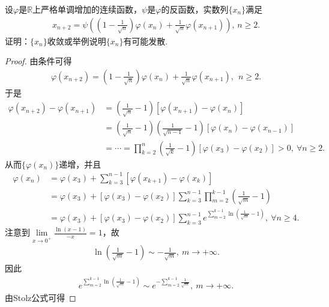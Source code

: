 \documentclass[../../main.tex]{subfiles}
\begin{document}
\begin{example}
设$\varphi$是$\mathbb{R}$上严格单调增加的连续函数，$\psi$是$\varphi$的反函数，实数列$\{x_n\}$满足
\begin{align*}
x_{n+2} = \psi\left( \left(1 - \frac{1}{\sqrt{n}}\right)\varphi(x_n) + \frac{1}{\sqrt{n}}\varphi(x_{n+1}) \right), \, n \geqslant 2.
\end{align*}
证明：$\{x_n\}$收敛或举例说明$\{x_n\}$有可能发散.
\end{example}
\begin{proof}
由条件可得
\begin{align*}
\varphi(x_{n+2}) = \left(1 - \frac{1}{\sqrt{n}}\right)\varphi(x_n) + \frac{1}{\sqrt{n}}\varphi(x_{n+1}),\ \ n \geqslant 2.
\end{align*}
于是
\begin{align*}
\varphi(x_{n+2}) - \varphi(x_{n+1}) &= \left( \frac{1}{\sqrt{n}} - 1 \right)\left[ \varphi(x_{n+1}) - \varphi(x_n) \right] \\
&= \left( \frac{1}{\sqrt{n}} - 1 \right)\left( \frac{1}{\sqrt{n-1}} - 1 \right)\left[ \varphi(x_n) - \varphi(x_{n-1}) \right] \\
&= \cdots = \prod_{k=2}^n \left( \frac{1}{\sqrt{k}} - 1 \right)\left[ \varphi(x_3) - \varphi(x_2) \right] > 0,\ \forall n \geqslant 2.
\end{align*}
从而$\{\varphi(x_n)\}$递增，并且
\begin{align}
\varphi(x_n) &= \varphi(x_3) + \sum\limits_{k=3}^{n-1} \left[ \varphi(x_{k+1}) - \varphi(x_k) \right]\nonumber \\
&= \varphi(x_3) + \left[ \varphi(x_3) - \varphi(x_2) \right] \sum\limits_{k=3}^{n-1} \prod_{m=2}^{k-1} \left( \frac{1}{\sqrt{m}} - 1 \right) \nonumber \\
&= \varphi(x_3) + \left[ \varphi(x_3) - \varphi(x_2) \right] \sum\limits_{k=3}^{n-1} e^{\sum\limits_{m=2}^{k-1} \ln\left( \frac{1}{\sqrt{m}} - 1 \right)},\ \forall n \geqslant 4. \label{eq::382wer346456yt34t3y4g44j76k67opp}
\end{align}
注意到$\lim\limits_{x \to 0^+} \frac{\ln(x - 1)}{-x} = 1$，故
\begin{align*}
\ln\left( \frac{1}{\sqrt{m}} - 1 \right) \sim -\frac{1}{\sqrt{m}},\ m \to +\infty.
\end{align*}
因此
\begin{align*}
e^{\sum\limits_{m=2}^{k-1} \ln\left( \frac{1}{\sqrt{m}} - 1 \right)} \sim e^{-\sum\limits_{m=2}^{k-1} \frac{1}{\sqrt{m}}},\ m \to +\infty.
\end{align*}
由Stolz公式可得

\end{proof}
\end{document}
